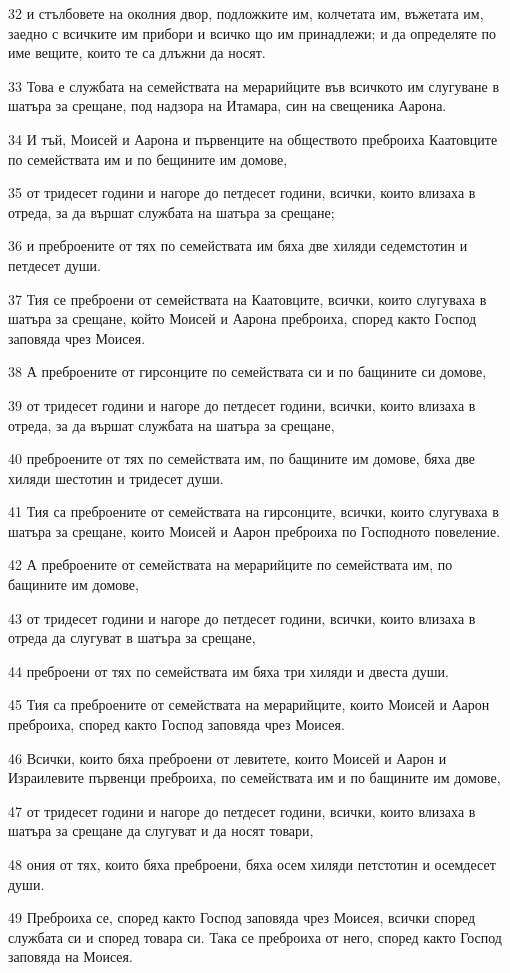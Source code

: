 \par 32 и стълбовете на околния двор, подложките им, колчетата им, въжетата им, заедно с всичките им прибори и всичко що им принадлежи; и да определяте по име вещите, които те са длъжни да носят.
\par 33 Това е службата на семействата на мерарийците във всичкото им слугуване в шатъра за срещане, под надзора на Итамара, син на свещеника Аарона.
\par 34 И тъй, Моисей и Аарона и първенците на обществото преброиха Каатовците по семействата им и по бещините им домове,
\par 35 от тридесет години и нагоре до петдесет години, всички, които влизаха в отреда, за да вършат службата на шатъра за срещане;
\par 36 и преброените от тях по семействата им бяха две хиляди седемстотин и петдесет души.
\par 37 Тия се преброени от семействата на Каатовците, всички, които слугуваха в шатъра за срещане, който Моисей и Аарона преброиха, според както Господ заповяда чрез Моисея.
\par 38 А преброените от гирсонците по семействата си и по бащините си домове,
\par 39 от тридесет години и нагоре до петдесет години, всички, които влизаха в отреда, за да вършат службата на шатъра за срещане,
\par 40 преброените от тях по семействата им, по бащините им домове, бяха две хиляди шестотин и тридесет души.
\par 41 Тия са преброените от семействата на гирсонците, всички, които слугуваха в шатъра за срещане, които Моисей и Аарон преброиха по Господното повеление.
\par 42 А преброените от семействата на мерарийците по семействата им, по бащините им домове,
\par 43 от тридесет години и нагоре до петдесет години, всички, които влизаха в отреда да слугуват в шатъра за срещане,
\par 44 преброени от тях по семействата им бяха три хиляди и двеста души.
\par 45 Тия са преброените от семействата на мерарийците, които Моисей и Аарон преброиха, според както Господ заповяда чрез Моисея.
\par 46 Всички, които бяха преброени от левитете, които Моисей и Аарон и Израилевите първенци преброиха, по семействата им и по бащините им домове,
\par 47 от тридесет години и нагоре до петдесет години, всички, които влизаха в шатъра за срещане да слугуват и да носят товари,
\par 48 ония от тях, които бяха преброени, бяха осем хиляди петстотин и осемдесет души.
\par 49 Преброиха се, според както Господ заповяда чрез Моисея, всички според службата си и според товара си. Така се преброиха от него, според както Господ заповяда на Моисея.

